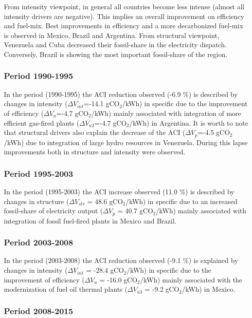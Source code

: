 \documentclass[energies,article,accept,moreauthors,12pt,a4paper]{mdpi} %
\begin{document}
From intensity viewpoint, in general all countries become less intense (almost all intensity drivers are negative). This implies an overall improvement on efficiency and fuel-mix. Best improvements in efficiency and a more decarbonized fuel-mix is observed in Mexico, Brazil and Argentina. 
From structural viewpoint, Venezuela and Cuba decreased their fossil-share in the electricity dispatch. Conversely, Brazil is showing the most important fossil-share of the region.


\subsubsection{Period 1990-1995}

In the period (1990-1995) the ACI reduction observed (-6.9 \%) is described by changes in intensity ($\Delta V_{int}$=-14.1 gCO$_2$/kWh) in specific due to the improvement of efficiency ($\Delta V_{u}$=-4.7 gCO$_2$/kWh) mainly associated with integration
of more efficient gas-fired plants ($\Delta V_{u2}$=-4.7 gCO$_2$/kWh) in Argentina. It is worth to note that structural drivers also explain the decrease of the ACI ($\Delta V_{p}$=-4.5 gCO$_2$/kWh) due to integration of large hydro resources in Venezuela.  During this lapse improvements both in structure and intensity were observed.

\subsubsection{Period 1995-2003}

In the period (1995-2003) the ACI increase observed (11.0 \%) is described by changes in structure ($\Delta V_{str}$ = 48.6 gCO$_2$/kWh) in specific due to an increased fossil-share of electricity output ($\Delta V_{p}$ = 40.7 gCO$_2$/kWh) mainly associated with integration of  fossil fuel-fired plants in Mexico and Brazil.

\subsubsection{Period 2003-2008}

In the period (2003-2008) the ACI reduction observed (-9.1 \%) is explained by changes in intensity ($\Delta V_{int}$ = -28.4 gCO$_2$/kWh) in specific due to the improvement of efficiency ($\Delta V_{u}$ = -16.0 gCO$_2$/kWh) mainly associated with the modernization of fuel oil thermal plants ($\Delta V_{u3}$ = -9.2 gCO$_2$/kWh) in Mexico.

\subsubsection{Period 2008-2015}
\end{document}
